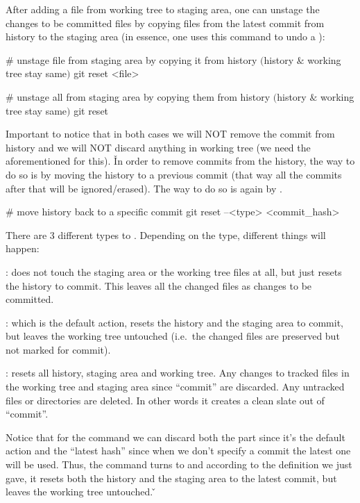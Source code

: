 
After adding a file from working tree to staging area, one can unstage the changes to be committed files by copying
files from the latest commit from history to the staging area (in essence, one uses this command to undo a ):

\begin{bash}
# unstage file from staging area by copying it from history $($history $\&$ working tree stay same$)$
git reset <file>
\end{bash}

\begin{bash}
# unstage all from staging area by copying them from history $($history $\&$ working tree stay same$)$
git reset
\end{bash}


Important to notice that in both cases we will NOT remove the commit from history and we will NOT discard anything in
working tree (we need the aforementioned  for this). \v

In order to remove commits from the history, the way to do so is by moving the history to a previous commit (that way
all the commits after that will be ignored/erased). The way to do so is again by .

\begin{bash}
# move history back to a specific commit
git reset --<type> <commit_hash>
\end{bash}

There are 3 different types to . Depending on the type, different things will happen:
\bit
\item {}: does not touch the staging area or the working tree files at all, but just resets the history to
commit. This leaves all the changed files as changes to be committed.
\item {}: which is the default action, resets the history and the staging area to commit, but leaves the
working tree untouched (i.e.\ the changed files are preserved but not marked for commit).
\item {}: resets all history, staging area and working tree. Any changes to tracked files in the working
tree and staging area since ``commit'' are discarded. Any untracked files or directories are deleted. In other words
it creates a clean slate out of ``commit''.
\eit

Notice that for the command  we can discard both the  part
since it's the default action and the ``latest hash'' since when we don't specify a commit the latest one will be
used. Thus, the command turns to  and according to the definition we just gave, it resets both the
history and the staging area to the latest commit, but leaves the working tree untouched. \v

